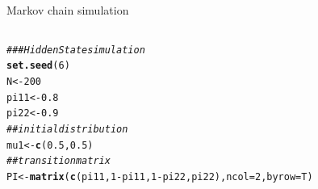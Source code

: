 \documentclass{beamer}\usepackage[]{graphicx}\usepackage[]{color}
\makeatletter
\newcommand{\hlnum}[1]{\textcolor[rgb]{0.686,0.059,0.569}{#1}}%
\newcommand{\hlcom}[1]{\textcolor[rgb]{0.678,0.584,0.686}{\textit{#1}}}%
\newcommand{\hlopt}[1]{\textcolor[rgb]{0,0,0}{#1}}%
\newcommand{\hlstd}[1]{\textcolor[rgb]{0.345,0.345,0.345}{#1}}%
\newcommand{\hlkwb}[1]{\textcolor[rgb]{0.69,0.353,0.396}{#1}}%
\newcommand{\hlkwc}[1]{\textcolor[rgb]{0.333,0.667,0.333}{#1}}%
\newcommand{\hlkwd}[1]{\textcolor[rgb]{0.737,0.353,0.396}{\textbf{#1}}}%
\newenvironment{kframe}{%
 \def\at@end@of@kframe{}%
 \ifinner\ifhmode%
  \def\at@end@of@kframe{\end{minipage}}%
  \begin{minipage}{\columnwidth}%
 \fi\fi%
 \def\FrameCommand##1{\hskip\@totalleftmargin \hskip-\fboxsep
 \colorbox{shadecolor}{##1}\hskip-\fboxsep
     \hskip-\linewidth \hskip-\@totalleftmargin \hskip\columnwidth}%
 \MakeFramed {\advance\hsize-\width
   \@totalleftmargin\z@ \linewidth\hsize
   \@setminipage}}%
 {\par\unskip\endMakeFramed%
 \at@end@of@kframe}
\newenvironment{knitrout}{}{} %
\makeatother
\begin{document}
\begin{frame}[fragile]{Markov chain simulation}

\begin{columns}
\begin{column}{0.5\textwidth}
\begin{knitrout}\tiny
{}\color{fgcolor}\begin{kframe}
\begin{alltt}
\hlcom{### Hidden State simulation}
\hlkwd{set.seed}\hlstd{(}\hlnum{6}\hlstd{)}
\hlstd{N} \hlkwb{<-} \hlnum{200}
\hlstd{pi11} \hlkwb{<-} \hlnum{0.8}
\hlstd{pi22} \hlkwb{<-} \hlnum{0.9}
\hlcom{## initial distribution}
\hlstd{mu1} \hlkwb{<-} \hlkwd{c}\hlstd{(}\hlnum{0.5}\hlstd{,} \hlnum{0.5}\hlstd{)}
\hlcom{##transition matrix}
\hlstd{PI} \hlkwb{<-} \hlkwd{matrix}\hlstd{(}\hlkwd{c}\hlstd{(pi11,} \hlnum{1}\hlopt{-}\hlstd{pi11,} \hlnum{1}\hlopt{-}\hlstd{pi22, pi22),} \hlkwc{ncol}\hlstd{=}\hlnum{2}\hlstd{,} \hlkwc{byrow} \hlstd{= T)}


\end{alltt}
\end{kframe}
\end{knitrout}
\end{column}
\end{columns}
\end{frame}
\end{document}
